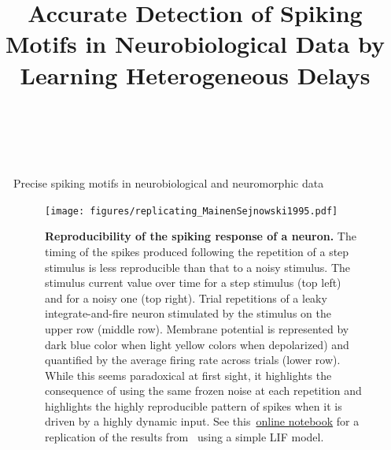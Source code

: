 \documentclass[final]{beamer}
\title{Accurate Detection of Spiking Motifs in Neurobiological Data by Learning Heterogeneous Delays
}
\author{\FirstLP\  \LastLP}
\institute[shortinst]{\Department, \Affiliation,  \Street, \City\ \Country}
\newlength{\sepwidth}
\newlength{\colwidth}
\newcommand{\separatorcolumn}{\begin{column}{\sepwidth}\end{column}}
\begin{document}
\begin{frame}[t]
\begin{columns}[t]
\separatorcolumn

\begin{column}{\colwidth}

  \begin{block}{Precise spiking motifs in neurobiological and neuromorphic data~\parencite{Grimaldi22polychronies}}


\begin{figure}[H]
\texttt{[image: figures/replicating\_MainenSejnowski1995.pdf]} 
\caption{
 \textbf{Reproducibility of the spiking response of a neuron.} 
The timing of the spikes produced following the repetition of a step stimulus is less reproducible than that to a noisy stimulus. The stimulus current value over time for a step stimulus (top left) and for a noisy one (top right). Trial repetitions of a leaky integrate-and-fire neuron stimulated by the stimulus on the upper row (middle row). Membrane potential is represented by dark blue color when light yellow colors when depolarized) and quantified by the average firing rate across trials (lower row). While this seems paradoxical at first sight, it highlights the consequence of using the same frozen noise at each repetition and highlights the highly reproducible pattern of spikes when it is driven by a highly dynamic input. See this~\href{https://github.com/laurentperrinet/2022_UE-neurosciences-computationnelles/blob/master/C_MainenSejnowski1995_Perrinet.ipynb}{online notebook}  for a replication of the results from~\parencite{mainen_reliability_1995} using a simple LIF model.}\label{fig:mainen}
\end{figure}
    



\end{block}
\end{column}
\end{columns}
\end{frame}
\end{document}
